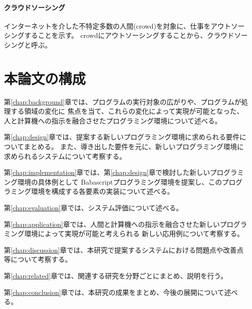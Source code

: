 \paragraph{クラウドソーシング}\label{ux30afux30e9ux30a6ux30c9ux30bdux30fcux30b7ux30f3ux30b0}

インターネットを介した不特定多数の人間(crowd)を対象に、仕事をアウトソーシングすることを示す。
crowdにアウトソーシングすることから、クラウドソーシングと呼ぶ。

\section{本論文の構成}\label{ux672cux8ad6ux6587ux306eux69cbux6210}

第\ref{chap:background}章では、プログラムの実行対象の広がりや、プログラムが処理する領域の変化に
焦点を当て、これらの変化によって実現が可能となった、人と計算機への指示を融合させたプログラミング環境について述べる。

第\ref{chap:design}章では、提案する新しいプログラミング環境に求められる要件についてまとめる。
また、導き出した要件を元に、新しいプログラミング環境に求められるシステムについて考察する。

第\ref{chap:implementation}章では、第\ref{chap:design}章で検討した新しいプログラミング環境の具体例として
Babascriptプログラミング環境を提案し、このプログラミング環境を構成する各要素の実装について述べる。

第\ref{chap:evaluation}章では、システム評価について述べる。

第\ref{chap:application}章では、人間と計算機への指示を融合させた新しいプログラミング環境によって実現が可能と考えられる
新しい応用例について考察する。

第\ref{chap:discussion}章では、本研究で提案するシステムにおける問題点や改善点等について考察する。

第\ref{chap:related}章では、関連する研究を分野ごとにまとめ、説明を行う。

第\ref{chap:conclusion}章では、本研究の成果をまとめ、今後の展開について述べる。
